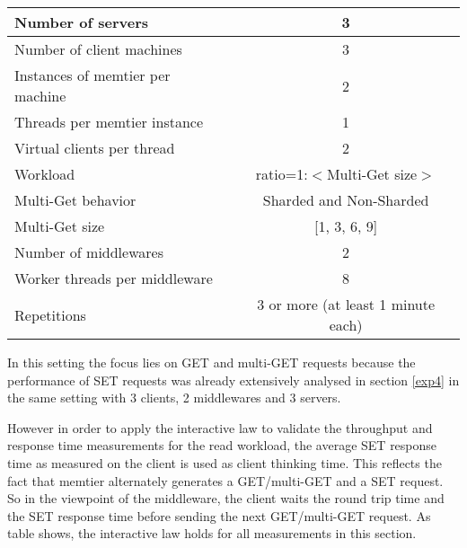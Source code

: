 \documentclass[report.tex]{subfiles}
\begin{document}
\begin{center}
	\scriptsize{
		\begin{tabular}{|l|c|}
			\hline Number of servers                & 3                       \\ 
			\hline Number of client machines        & 3                       \\ 
			\hline Instances of memtier per machine & 2                       \\ 
			\hline Threads per memtier instance     & 1                       \\
			\hline Virtual clients per thread       & 2     		           \\ 
			\hline Workload                         & ratio=1:$<$Multi-Get size$>$         \\
			\hline Multi-Get behavior               & Sharded and Non-Sharded  \\
			\hline Multi-Get size                   & [1, 3, 6, 9]            \\
			\hline Number of middlewares            & 2                       \\
			\hline Worker threads per middleware    & 8 \\
			\hline Repetitions                      & 3 or more (at least 1 minute each)               \\ 
			\hline 
		\end{tabular}
	} 
\end{center}

In this setting the focus lies on GET and multi-GET requests because the performance of SET requests was already extensively analysed in section \ref{exp4} in the same setting with 3 clients, 2 middlewares and 3 servers.

However in order to apply the interactive law to validate the throughput and response time measurements for the read workload, the average SET response time as measured on the client is used as client thinking time. This reflects the fact that memtier alternately generates a GET/multi-GET and a SET request. So in the viewpoint of the middleware, the client waits the round trip time and the SET response time before sending the next GET/multi-GET request. As table  shows, the interactive law holds for all measurements in this section.

\end{document}
